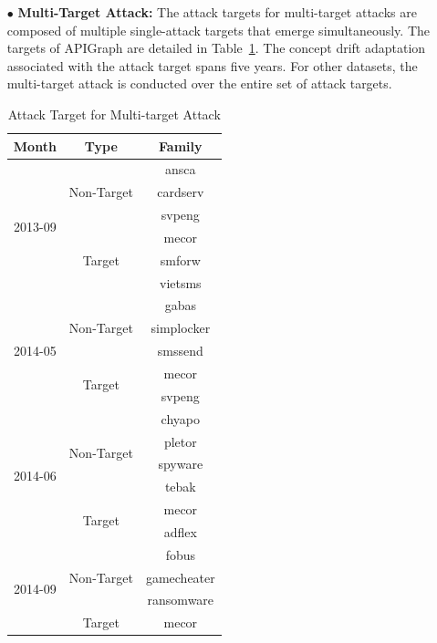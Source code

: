 \documentclass[conference,compsoc]{IEEEtran} %
\begin{document}
\begin{itemize}[leftmargin=*]
	\item[$\bullet$] \textbf{Multi-Target Attack:} 
	The attack targets for multi-target attacks are composed of multiple single-attack targets that emerge simultaneously.
	The targets of APIGraph are detailed in Table~\ref{tab: Attack Target for Multi-target Attack}.
	The concept drift adaptation associated with the attack target spans five years.
	For other datasets, the multi-target attack is conducted over the entire set of attack targets.
	\begin{table}[ht!]
		\begin{center}
			\caption{Attack Target for Multi-target Attack} %
			\label{tab: Attack Target for Multi-target Attack} %
			\renewcommand{\arraystretch}{0.8}  %
			\begin{tabular}{ccc} %
				\toprule
				\textbf{Month} & \textbf{Type} & \textbf{Family} \\
				\midrule
				\multirow{6}{*}{2013-09} & \multirow{3}{*}{Non-Target} 	& ansca \\ 
				&	& cardserv \\ 
				&	& svpeng  \\ \cline{2-3}
				& \multirow{3}{*}{Target} 	& mecor  \\
				&	& smforw \\
				&	& vietsms \\
				\midrule
				\multirow{5}{*}{2014-05} & \multirow{3}{*}{Non-Target} 	& gabas \\ 
				&	& simplocker \\ 
				&	& smssend \\ \cline{2-3}
				& \multirow{2}{*}{Target} 	& mecor  \\
				&	& svpeng  \\ 
				\midrule
				\multirow{6}{*}{2014-06} & \multirow{4}{*}{Non-Target} 	& chyapo \\ 
				&	& pletor \\
				&	& spyware \\
				&   & tebak   \\ \cline{2-3}
				& \multirow{2}{*}{Target} 	& mecor \\
				&   & adflex  \\
				\midrule
				\multirow{5}{*}{2014-09} & \multirow{3}{*}{Non-Target} 	& fobus \\ 
				&	& gamecheater \\
				&   & ransomware  \\ \cline{2-3}
				& \multirow{2}{*}{Target} 	& mecor \\

\end{tabular}
\end{center}
\end{table}
\end{itemize}
\end{document}
